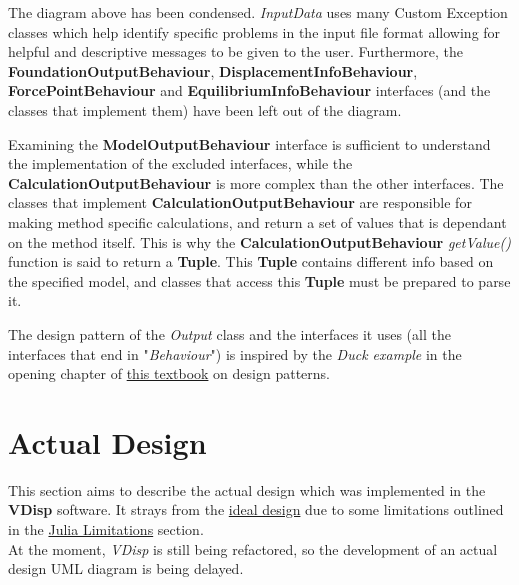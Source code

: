 \documentclass[11pt,fleqn]{article}
\newcommand{\indentpar}{\phantom{=}}
\begin{document}
    \indentpar The diagram above has been condensed. \emph{InputData} uses many 
    Custom Exception classes which help identify specific problems in the input file
    format allowing for helpful and descriptive messages to be given to the user. Furthermore,
    the \textbf{FoundationOutputBehaviour}, \textbf{DisplacementInfoBehaviour}, \textbf{ForcePointBehaviour} and
    \textbf{EquilibriumInfoBehaviour} interfaces (and the classes that implement them) have 
    been left out of the diagram. 
    
    \indentpar Examining the \textbf{ModelOutputBehaviour} interface is sufficient
    to understand the implementation of the excluded interfaces, while the \textbf{CalculationOutputBehaviour}
    is more complex than the other interfaces. The classes that implement \textbf{CalculationOutputBehaviour}
    are responsible for making method specific calculations, and return a set of values that is dependant on 
    the method itself. This is why the \textbf{CalculationOutputBehaviour} \emph{getValue()} function is said to
    return a \textbf{Tuple}. This \textbf{Tuple} contains different info based on the specified model, and classes
    that access this \textbf{Tuple} must be prepared to parse it.

    \indentpar The design pattern of the \emph{Output} class and the interfaces it uses (all the interfaces that 
    end in "\emph{Behaviour}") is inspired by the \emph{Duck example} in the opening chapter of \href{https://github.com/ksatria/MK-Design-Pattern/blob/master/Ebook/Head%20First%20Design%20Patterns.pdf}{this textbook}
    on design patterns.
    
    \section*{Actual Design} \label{actualDesign}

    \indentpar This section aims to describe the actual design which was implemented
    in the \textbf{VDisp} software. It strays from the \hyperref[initialDesign]{ideal design} due
    to some limitations outlined in the \hyperref[juliaLimits]{Julia Limitations} section.\\

    \indentpar At the moment, \emph{VDisp} is still being refactored, so the development 
    of an actual design UML diagram is being delayed.
    
\end{document}
